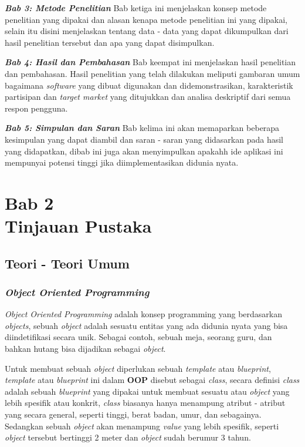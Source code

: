 \documentclass[a4paper]{article}
\newcommand{\bab}[2]{%
    \addtocounter{section}{1}%
    \setcounter{subsection}{0}
    \setcounter{subsubsection}{0}
    \setcounter{figure}{0}
    \setcounter{table}{0}
    \section*{#1\\#2}%
    \addcontentsline{toc}{section}{\protect\numberline{}#1 #2}%
}
\newcommand{\subbab}[1]{%
    \subsection{#1}%
    \setcounter{figure}{0}
    \setcounter{table}{0}
}
\newcommand{\subsubbab}[1]{%
    \subsubsection{#1}%
}
\begin{document}
\textit{\textbf{Bab 3: Metode Penelitian}}\newline
Bab ketiga ini menjelaskan konsep metode penelitian yang dipakai dan alasan kenapa metode penelitian ini yang dipakai, selain itu disini menjelaskan tentang data - data yang dapat dikumpulkan dari hasil penelitian tersebut dan apa yang dapat disimpulkan.

\textit{\textbf{Bab 4: Hasil dan Pembahasan}}\newline
Bab keempat ini menjelaskan hasil penelitian dan pembahasan. Hasil penelitian yang telah dilakukan meliputi gambaran umum bagaimana \textit{software} yang dibuat digunakan dan didemonstrasikan, karakteristik partisipan dan \textit{target market} yang ditujukkan dan analisa deskriptif dari semua respon pengguna.

\textit{\textbf{Bab 5: Simpulan dan Saran}}\newline
Bab kelima ini akan memaparkan beberapa kesimpulan yang dapat diambil dan saran - saran yang didasarkan pada hasil yang didapatkan, dibab ini juga akan menyimpulkan apakahh ide aplikasi ini mempunyai potensi tinggi jika diimplementasikan didunia nyata.

\newpage
{}
\newpage
\bab{Bab 2}{Tinjauan Pustaka}
\subbab{Teori - Teori Umum}

\subsubbab{\textit{Object Oriented Programming}}
\textit{Object Oriented Programming} adalah konsep programming yang berdasarkan \textit{objects}, sebuah \textit{object} adalah sesuatu entitas yang ada didunia nyata yang bisa diindetifikasi secara unik\autocite{liang_liang_2021}. Sebagai contoh, sebuah meja, seorang guru, dan bahkan hutang bisa dijadikan sebagai \textit{object}.

Untuk membuat sebuah \textit{object} diperlukan sebuah \textit{template} atau \textit{blueprint}, \textit{template} atau \textit{blueprint} ini dalam \textbf{OOP} disebut sebagai \textit{class}, secara definisi \textit{class} adalah sebuah \textit{blueprint} yang dipakai untuk membuat sesuatu atau \textit{object} yang lebih spesifik atau konkrit\autocite{education-erin-oop-2020}, \textit{class} biasanya hanya menampung atribut - atribut yang secara general, seperti tinggi, berat badan, umur, dan sebagainya. Sedangkan sebuah \textit{object} akan menampung \textit{value} yang lebih spesifik, seperti \textit{object} tersebut bertinggi 2 meter dan \textit{object} sudah berumur 3 tahun.
\end{document}
